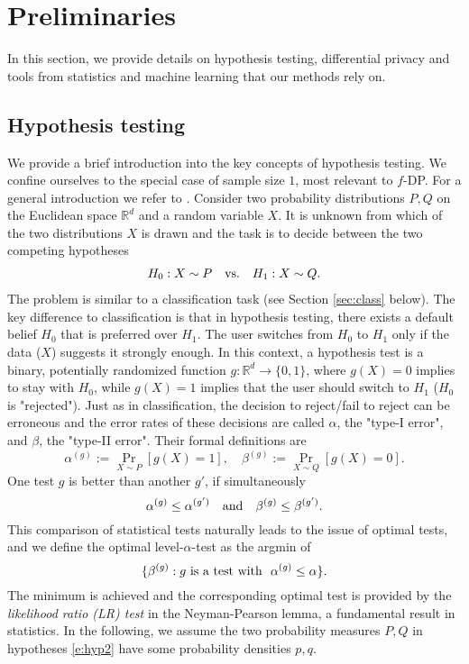 \section{Preliminaries}\label{sec:prelim}

In this section, we provide details on hypothesis testing, differential privacy and tools from statistics and machine learning that our methods rely on.

\subsection{Hypothesis testing} \label{sec:hyp}

We provide a brief introduction into the key concepts of hypothesis testing. We confine ourselves to the special case of sample size $1$, most relevant to $f$-DP. 
For a general introduction we refer to \cite{Bickel2001}.
Consider two probability distributions $P, Q$ on the Euclidean space $\mathbb{R}^d$ and a random variable $X$. It is unknown from which of the two distributions $X$ is drawn and the task is to decide between the two competing hypotheses
\begin{align} \label{e:hyp2}
H_0: X \sim P\quad \textnormal{vs.} \quad H_1: X \sim Q.
\end{align}
The problem is similar to a classification task (see Section \ref{sec:class} below). The key difference to classification is that in hypothesis testing, there exists a default belief $H_0$ that is preferred over $H_1$. The user switches from $H_0$ to $H_1$ only if the data ($X$) suggests it strongly enough. In this context, a hypothesis test is a binary, potentially randomized function $g: \mathbb{R}^d \to \{0,1\}$, where $g(X)=0$ implies to stay with $H_0$, while $g(X)=1$ implies that the user should switch to $H_1$ ($H_0$ is "rejected"). Just as in classification, the decision to reject/fail to reject can be erroneous and the error rates of these decisions are called $\alpha$, the "type-I error", and $\beta$, the "type-II error". Their formal definitions are
\[
\alpha^{(g)}:= \Pr_{X \sim P}[g(X)= 1], \quad \beta^{(g)}:= \Pr_{X \sim Q}[g(X)= 0].
\]
One test $g$ is better than another $g'$, if simultaneously
\[
\alpha^{(g)} \le \alpha^{(g')} \quad \textnormal{and} \quad \beta^{(g)} \le \beta^{(g')}.
\]
This comparison of statistical tests naturally leads to the issue of optimal tests, 
and we define the optimal level-$\alpha$-test as the argmin of
 \[
 \{\beta^{(g)}: g \,\,\textnormal{is a  test}\,\, \textnormal{with } \,\, \alpha^{(g)}\le \alpha\}.
 \]
 The minimum is achieved and the corresponding optimal test is provided by the {\em likelihood ratio (LR) test} in the Neyman-Pearson lemma, a fundamental result in statistics. In the following, we assume the two probability measures $P,Q$ in hypotheses \eqref{e:hyp2} have some probability densities $p,q$.

